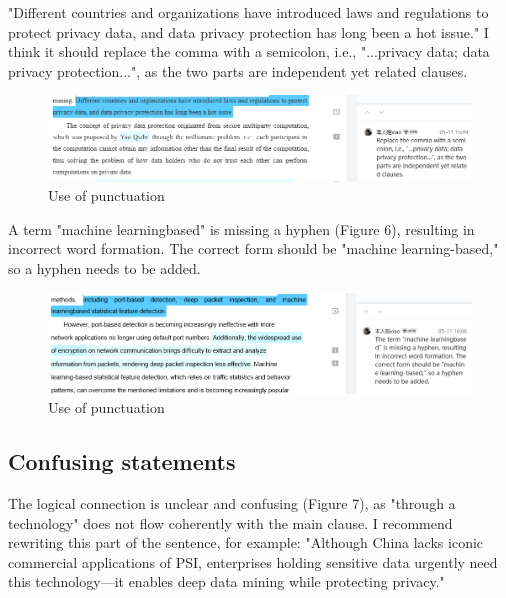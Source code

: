 \documentclass[sigconf]{acmart}
\begin{document}
"Different countries and organizations have introduced laws and regulations 
to protect privacy data, and data privacy protection has long been a hot issue."
I think it should replace the comma with a semicolon, i.e., "...privacy data; data privacy protection...", 
as the two parts are independent yet related clauses.

\begin{figure}[h]
  \centering
  \includegraphics[width=\linewidth]{./picture/punctuation_1.png}
  \caption{Use of punctuation}
\end{figure}

A term "machine learningbased" is missing a hyphen (Figure 6), resulting in incorrect word formation. 
The correct form should be "machine learning-based," so a hyphen needs to be added.

\begin{figure}[h]
  \centering
  \includegraphics[width=\linewidth]{./picture/punctuation_2.png}
  \caption{Use of punctuation}
\end{figure}

\subsection{Confusing statements}

The logical connection is unclear and confusing (Figure 7), as "through a technology" does not flow coherently with the main clause. 
I recommend rewriting this part of the sentence, for example:
"Although China lacks iconic commercial applications of PSI, 
enterprises holding sensitive data urgently need this technology—it enables 
deep data mining while protecting privacy."
\end{document}
